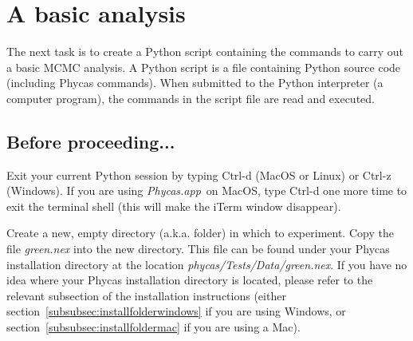 \documentclass[10pt]{article}
\newcommand{\pathname}[1]{{\em #1}}				%
\newcommand{\keycmd}[1]{{\sf #1}}					%
\newcommand{\phycasapp}{\pathname{Phycas.app}}
\begin{document}
\section{A basic analysis} \label{sec:basic}

The next task is to create a Python script containing the commands to carry out a basic MCMC analysis. A Python script is a file containing Python source code (including Phycas commands). When submitted to the Python interpreter (a computer program), the commands in the script file are read and executed.  

\subsection{Before proceeding...}
Exit your current Python session by typing \keycmd{Ctrl-d} (MacOS or Linux) or \keycmd{Ctrl-z} (Windows). If you are using \phycasapp\ on MacOS, type \keycmd{Ctrl-d} one more time to exit the terminal shell (this will make the iTerm window disappear). 

Create a new, empty directory (a.k.a. folder) in which to experiment. Copy the file \pathname{green.nex} into the new directory. This file can be found under your Phycas installation directory at the location \pathname{phycas/Tests/Data/green.nex}. If you have no idea where your Phycas installation directory is located, please refer to the relevant subsection of the installation instructions (either section~\ref{subsubsec:installfolderwindows} if you are using Windows, or section~\ref{subsubsec:installfoldermac} if you are using a Mac).

\end{document}
